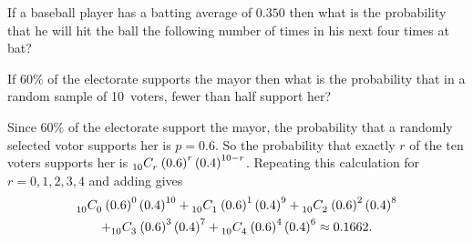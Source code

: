 \documentclass[answers,12pt]{exam}
\newcommand\ncr[2]{\tensor[_{#1}]C{_{#2}}}
\begin{document}
\begin{questions}

\question If a baseball player has a batting average
of $0.350$ then what is the probability that he
will hit the ball the following number of times in his next four
times at bat?

\question If $60\%$ of the electorate supports the mayor
then what is the probability that in a random sample
of 10~voters, fewer than half support her?
\begin{solution} Since $60\%$ of the electorate support the mayor,
the probability that a randomly selected votor supports her
is $p=0.6$. So the probability that exactly $r$ of the ten voters
supports her is $\ncr{10}{r}\left(0.6\right)^r\left(0.4\right)^{10-r}$.
Repeating this calculation for $r=0,1,2,3,4$ and adding gives
\begin{multline*}
\ncr{10}{0}\left(0.6\right)^0\left(0.4\right)^{10}
+\ncr{10}{1}\left(0.6\right)^1\left(0.4\right)^9
+\ncr{10}{2}\left(0.6\right)^2\left(0.4\right)^8\\
+\ncr{10}{3}\left(0.6\right)^3\left(0.4\right)^7
+\ncr{10}{4}\left(0.6\right)^4\left(0.4\right)^6
\approx 0.1662.
\end{multline*}
\end{solution}
\end{questions}
\end{document}
